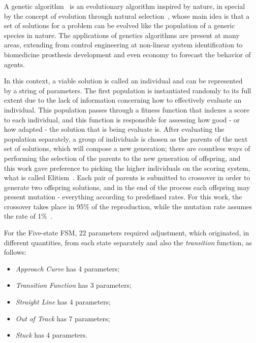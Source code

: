 	A genetic algorithm~\cite{GA} is an evolutionary algorithm inspired by nature, in special by the concept of
	evolution through natural selection~\cite{Darwin}, whose main idea is that a set of solutions for a problem can
	be evolved like the population of a generic species in nature. The applications of genetics algorithms are
	present at many areas, extending from control engineering at non-linear system identification to biomedicine
	prosthesis development and even economy to forecast the behavior of agents.
	
	In this context, a viable solution is called an individual and can be represented by a string of parameters. The
	first population is instantiated randomly to its full extent due to the lack of information concerning how to
	effectively evaluate an individual. This population passes through a fitness function that indexes a score to
	each individual, and this function is responsible for assessing how good - or how adapted - the solution that is
	being evaluate is. After evaluating the population separately, a group of individuals is chosen as the parents of
	the next set of solutions, which will compose a new generation; there are countless ways of performing the
	selection of the parents to the new generation of offspring, and this work gave preference to picking the higher
	individuals on the scoring system, what is called Elitism~\cite{ELITISM}. Each pair of parents is submitted to
	crossover in order to generate two offspring solutions, and in the end of the process each offspring may present
	mutation - everything according to predefined rates. For this work, the crossover takes place in 95\% of the
	reproduction, while the mutation rate assumes the rate of 1\%~\cite{RATES}.
	
	For the Five-state FSM, 22 parameters required adjustment, which originated, in different quantities, from each
	state separately and also the \emph{transition} function, as follows:
	
	\begin{itemize}
		
		\item \emph{Approach Curve} has 4 parameters;
		
		\item \emph{Transition Function} has 3 parameters;
		
		\item \emph{Straight Line} has 4 parameters;
		
		\item \emph{Out of Track} has 7 parameters;
		
		\item \emph{Stuck} has 4 parameters.
		
	\end{itemize}
	
